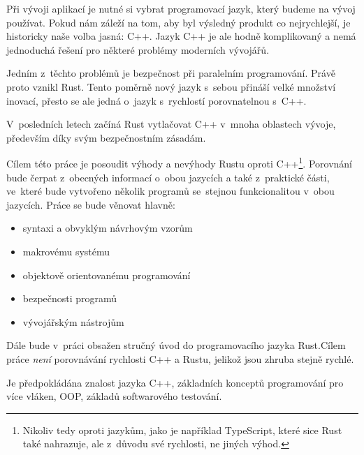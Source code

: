 \documentclass[main.tex]{subfiles}
\begin{document}


Při vývoji aplikací je nutné si vybrat programovací jazyk, který budeme na vývoj
používat. Pokud nám záleží na tom, aby byl výsledný produkt co nejrychlejší,
je historicky naše volba jasná: C++. Jazyk C++ je ale hodně komplikovaný a nemá
jednoduchá řešení pro některé problémy moderních vývojářů.

Jedním z~těchto problémů je bezpečnost při paralelním programování. Právě proto
vznikl Rust. Tento poměrně nový jazyk s~sebou přináší velké množství inovací, přesto
se ale jedná o~jazyk s~rychlostí porovnatelnou s~C++.

V~posledních letech začíná Rust vytlačovat C++ v~mnoha oblastech vývoje, především
díky svým bezpečnostním zásadám.


Cílem této práce je posoudit výhody a nevýhody Rustu oproti C++\footnote{Nikoliv
    tedy oproti jazykům, jako je například TypeScript, které sice Rust také nahrazuje,
    ale z~důvodu své rychlosti, ne jiných výhod.
}. Porovnání bude čerpat z~obecných informací o~obou jazycích a také z~praktické části,
ve~které bude vytvořeno několik programů se~stejnou funkcionalitou v~obou jazycích.
Práce se bude věnovat hlavně:
\begin{itemize}
    \item syntaxi a obvyklým návrhovým vzorům
    \item makrovému systému
    \item objektově orientovanému programování
    \item bezpečnosti programů
    \item vývojářským nástrojům
\end{itemize}

Dále bude v~práci obsažen stručný úvod do programovacího jazyka Rust.Cílem práce
\emph{není} porovnávání rychlosti C++ a Rustu, jelikož jsou zhruba stejně rychlé.


Je předpokládána znalost jazyka C++, základních konceptů programování pro více vláken,
OOP, základů softwarového testování.
\end{document}
